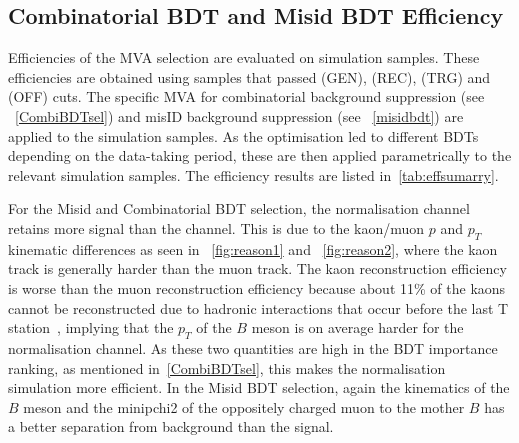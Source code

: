 \subsection{Combinatorial BDT and Misid BDT Efficiency}
 Efficiencies of the MVA selection are evaluated on simulation samples. These efficiencies are obtained using samples that passed (GEN), (REC), (TRG) and (OFF) cuts. The specific MVA for combinatorial background suppression (see ~\autoref{CombiBDTsel}) and misID background suppression (see ~\autoref{misidbdt}) are applied to the simulation samples. As the optimisation led to different BDTs depending on the data-taking period, these are then applied parametrically to the relevant simulation samples. The efficiency results are listed in~\autoref{tab:effsumarry}.

For the Misid and Combinatorial BDT selection, the normalisation \bjpsimumuk channel retains more signal than the \Bmumumu channel. This is due to the kaon/muon $p$ and $p_{T}$ kinematic differences as seen in ~\autoref{fig:reason1} and ~\autoref{fig:reason2}, where the kaon track is generally harder than the muon track. The kaon reconstruction efficiency is worse than the muon reconstruction efficiency because about 11\% of the kaons cannot be reconstructed due to hadronic interactions that occur before the last T station~\cite{LHCb-DP-2013-002}, implying that the $p_{T}$ of the $B$ meson is on average harder for the normalisation channel. As these two quantities are high in the BDT importance ranking, as mentioned in~\autoref{CombiBDTsel}, this makes  the normalisation simulation more efficient. In the Misid BDT selection, again the kinematics of the $B$ meson and the \gls{minipchi2} of the oppositely charged muon to the mother $B$ has a better separation from background than the signal.



